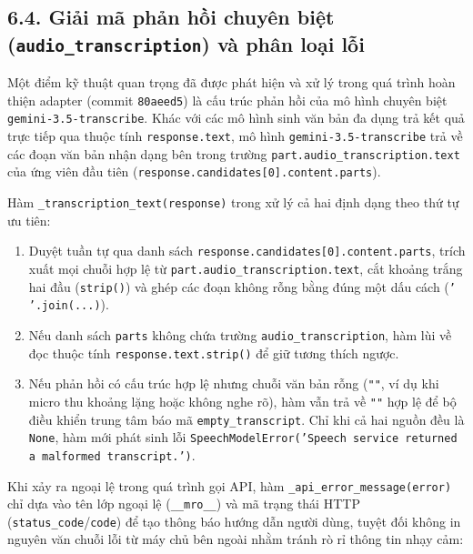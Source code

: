 \subsection*{6.4. Giải mã phản hồi chuyên biệt (\texttt{audio\_transcription}) và phân loại lỗi}

Một điểm kỹ thuật quan trọng đã được phát hiện và xử lý trong quá trình hoàn thiện adapter (commit \texttt{80aeed5}) là cấu trúc phản hồi của mô hình chuyên biệt \texttt{gemini-3.5-transcribe}. Khác với các mô hình sinh văn bản đa dụng trả kết quả trực tiếp qua thuộc tính \texttt{response.text}, mô hình \texttt{gemini-3.5-transcribe} trả về các đoạn văn bản nhận dạng bên trong trường \texttt{part.audio\_transcription.text} của ứng viên đầu tiên (\texttt{response.candidates[0].content.parts}).

Hàm \texttt{\_transcription\_text(response)} trong  xử lý cả hai định dạng theo thứ tự ưu tiên:
\begin{enumerate}[leftmargin=1.2cm]
  \item Duyệt tuần tự qua danh sách \texttt{response.candidates[0].content.parts}, trích xuất mọi chuỗi hợp lệ từ \texttt{part.audio\_transcription.text}, cắt khoảng trắng hai đầu (\texttt{strip()}) và ghép các đoạn không rỗng bằng đúng một dấu cách (\texttt{' '.join(...)}).
  \item Nếu danh sách \texttt{parts} không chứa trường \texttt{audio\_transcription}, hàm lùi về đọc thuộc tính \texttt{response.text.strip()} để giữ tương thích ngược.
  \item Nếu phản hồi có cấu trúc hợp lệ nhưng chuỗi văn bản rỗng (\texttt{""}, ví dụ khi micro thu khoảng lặng hoặc không nghe rõ), hàm vẫn trả về \texttt{""} hợp lệ để bộ điều khiển trung tâm báo mã \texttt{empty\_transcript}. Chỉ khi cả hai nguồn đều là \texttt{None}, hàm mới phát sinh lỗi \texttt{SpeechModelError('Speech service returned a malformed transcript.')}.
\end{enumerate}

Khi xảy ra ngoại lệ trong quá trình gọi API, hàm \texttt{\_api\_error\_message(error)} chỉ dựa vào tên lớp ngoại lệ (\texttt{\_\_mro\_\_}) và mã trạng thái HTTP (\texttt{status\_code}/\texttt{code}) để tạo thông báo hướng dẫn người dùng, tuyệt đối không in nguyên văn chuỗi lỗi từ máy chủ bên ngoài nhằm tránh rò rỉ thông tin nhạy cảm:

